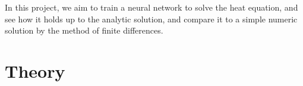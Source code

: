 \documentclass{article}
\theoremstyle{definition}
\begin{document}
In this project, we aim to train a neural network to solve the heat equation, and see how it holds up to the analytic solution, and compare it to a simple numeric solution by the method of finite differences.

\newpage
\section{Theory}
\end{document}
